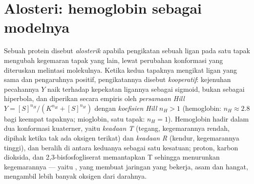 \section{Alosteri: hemoglobin sebagai modelnya}

\begin{definition}\label{def:b3:structural-biology:allostery}
%
Sebuah protein disebut \emph{alosterik} apabila pengikatan sebuah ligan pada
satu tapak mengubah kegemaran tapak yang lain, lewat perubahan konformasi yang
diteruskan melintasi molekulnya. Ketika kedua tapaknya mengikat ligan yang
sama dan pengaruhnya positif, pengikatannya disebut \emph{kooperatif}:
kejenuhan pecahannya $Y$ naik terhadap kepekatan ligannya sebagai sigmoid,
bukan sebagai hiperbola, dan diperikan secara empiris oleh \emph{persamaan
Hill} $Y = [S]^{n_{H}}/(K^{n_{H}} +
[S]^{n_{H}})$ dengan \emph{koefisien Hill} $n_{H} > 1$ (hemoglobin:
$n_{H} \approx 2.8$ bagi keempat tapaknya; mioglobin, satu tapak: $n_{H} =
1$). Hemoglobin hadir dalam dua konformasi kuaterner, yaitu
\emph{keadaan T} (tegang, kegemarannya rendah, dipihak ketika tak ada oksigen
terikat) dan \emph{keadaan R} (kendur, kegemarannya tinggi), dan beralih di
antara keduanya sebagai satu kesatuan; proton, karbon dioksida, dan
2,3-bisfosfogliserat memantapkan T sehingga menurunkan kegemarannya --- yaitu
, yang membuat jaringan yang bekerja, asam dan hangat, mengambil
lebih banyak oksigen dari darahnya.
\end{definition}

